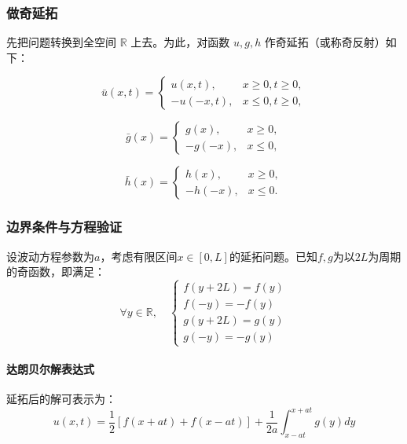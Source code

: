 \documentclass[12pt,a4paper]{article}
\numberwithin{subsection}{section}   %
\numberwithin{subsubsection}{subsection}
\theoremstyle{plain}
\theoremstyle{definition}
\theoremstyle{remark}
\theoremstyle{remark}
\begin{document}
	\subsubsection{做奇延拓}
先把问题转换到全空间 \(\mathbb{R}\) 上去。为此，对函数 \(u, g, h\) 作奇延拓（或称奇反射）如下：
	
	\begin{equation}
		\bar{u}(x, t) = \begin{cases}
			u(x, t), & x \geq 0, t \geq 0, \\
			-u(-x, t), & x \leq 0, t \geq 0,
		\end{cases}
	\end{equation}
	
	\begin{equation}
		\bar{g}(x) = \begin{cases}
			g(x), & x \geq 0, \\
			-g(-x), & x \leq 0,
		\end{cases}
	\end{equation}
	
	\begin{equation}
		\bar{h}(x) = \begin{cases}
			h(x), & x \geq 0, \\
			-h(-x), & x \leq 0.
		\end{cases}
	\end{equation}
	
\subsubsection{边界条件与方程验证}
设波动方程参数为$a$，考虑有限区间$x \in [0, L]$的延拓问题。已知$f,g$为以$2L$为周期的奇函数，即满足：
\begin{equation}
	\forall y \in \mathbb{R},\quad 
	\begin{cases}
		f(y + 2L) = f(y) \\
		f(-y) = -f(y) \\
		g(y + 2L) = g(y) \\
		g(-y) = -g(y)
	\end{cases}
\end{equation}

\paragraph{达朗贝尔解表达式}
延拓后的解可表示为：
\begin{equation}
	u(x,t) = \frac{1}{2}[f(x + at) + f(x - at)] + \frac{1}{2a}\int_{x-at}^{x+at} g(y) dy
\end{equation}
\end{document}
